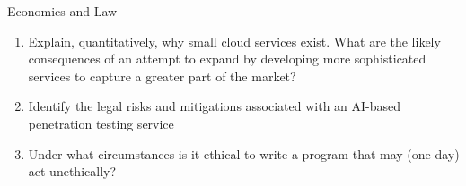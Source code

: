 \documentclass{tripos}
\begin{document}
\begin{question}[MockIA,year=2025,paper=2,question=6,author=nobody]{Economics and Law}

  \begin{enumerate}
  \item Explain, quantitatively, why small cloud services exist. What are the likely consequences of an attempt to expand by developing more sophisticated services to capture a greater part of the market? 
  \item Identify the legal risks and mitigations associated with an AI-based penetration testing service 
  \item Under what circumstances is it ethical to write a program that may (one day) act unethically? 
\end{enumerate}

\end{question}
\end{document}
